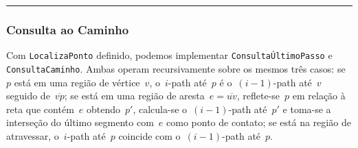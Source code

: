 \documentclass[11pt]{article}
\newcounter{algorithmref}
\newcommand{\alglabel}[1]{\refstepcounter{algorithmref}\label{#1}}
\begin{document}
\begin{algorithm}[h!]
\alglabel{alg:locate_point}
\caption{Localiza Ponto}
\vspace{0.3em}\hrule\vspace{0.3em}
\end{algorithm}

\subsubsection{Consulta ao Caminho}
\label{sec:query}

Com \texttt{LocalizaPonto} definido, podemos implementar \texttt{ConsultaÚltimoPasso} e \texttt{ConsultaCaminho}. Ambas operam recursivamente sobre os mesmos três casos: se~\(p\) está em uma região de vértice~\(v\), o~\(i\)-path até~\(p\) é o~\((i-1)\)-path até~\(v\) seguido de~\(\overline{vp}\); se está em uma região de aresta~\(e = \overline{uv}\), reflete-se~\(p\) em relação à reta que contém~\(e\) obtendo~\(p'\), calcula-se o~\((i-1)\)-path até~\(p'\) e toma-se a interseção do último segmento com~\(e\) como ponto de contato; se está na região de atravessar, o~\(i\)-path até~\(p\) coincide com o~\((i-1)\)-path até~\(p\).
\end{document}
